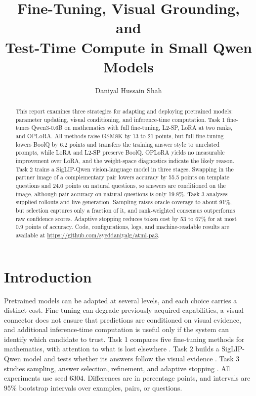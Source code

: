 \documentclass{article}
\title{Fine-Tuning, Visual Grounding, and\\Test-Time Compute in Small Qwen Models}
\author{Daniyal Hussain Shah}
\begin{document}
\maketitle

\begin{abstract}
This report examines three strategies for adapting and deploying pretrained models: parameter updating, visual conditioning, and inference-time computation. Task 1 fine-tunes Qwen3-0.6B on mathematics with full fine-tuning, L2-SP, LoRA at two ranks, and OPLoRA. All methods raise GSM8K by 13 to 21 points, but full fine-tuning lowers BoolQ by 6.2 points and transfers the training answer style to unrelated prompts, while LoRA and L2-SP preserve BoolQ. OPLoRA yields no measurable improvement over LoRA, and the weight-space diagnostics indicate the likely reason. Task 2 trains a SigLIP-Qwen vision-language model in three stages. Swapping in the partner image of a complementary pair lowers accuracy by 55.5 points on template questions and 24.0 points on natural questions, so answers are conditioned on the image, although pair accuracy on natural questions is only 19.8\%. Task 3 analyses supplied rollouts and live generation. Sampling raises oracle coverage to about 91\%, but selection captures only a fraction of it, and rank-weighted consensus outperforms raw confidence scores. Adaptive stopping reduces token cost by 53 to 67\% for at most 0.9 points of accuracy. Code, configurations, logs, and machine-readable results are available at \url{https://github.com/syeddaniyalg/atml-pa3}.
\end{abstract}

\section{Introduction}
Pretrained models can be adapted at several levels, and each choice carries a distinct cost. Fine-tuning can degrade previously acquired capabilities, a visual connector does not ensure that predictions are conditioned on visual evidence, and additional inference-time computation is useful only if the system can identify which candidate to trust. Task 1 compares five fine-tuning methods for mathematics, with attention to what is lost elsewhere \citep{hu2022lora,li2018l2sp,oplora,biderman2024}. Task 2 builds a SigLIP-Qwen model and tests whether its answers follow the visual evidence \citep{liu2023llava,zhai2023siglip,goyal2017vqa}. Task 3 studies sampling, answer selection, refinement, and adaptive stopping \citep{wang2023selfconsistency,kang2025selfcert,usman2025visconf,madaan2023selfrefine,aggarwal2023adaptive}. All experiments use seed 6304. Differences are in percentage points, and intervals are 95\% bootstrap intervals over examples, pairs, or questions.
\end{document}
